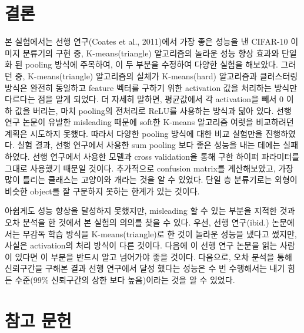 \documentclass[a4paper,9pt,hidelinks]{article}
\begin{document}
\begin{multicols*}{2}
\section{결론}

본 실험에서는 선행 연구(Coates et al., 2011)에서 가장 좋은 성능을 낸 CIFAR-10 이미지 분류기의 구현 중, K-means(triangle) 알고리즘의 놀라운 성능 향상 효과와 단일화 된 pooling 방식에 주목하여, 이 두 부분을 수정하여 다양한 실험을 해보았다.
그러던 중, K-means(triangle) 알고리즘의 실체가 K-means(hard) 알고리즘과 클러스터링 방식은 완전히 동일하고 feature 벡터를 구하기 위한 activation 값을 처리하는 방식만 다르다는 점을 알게 되었다.
더 자세히 말하면, 평균값에서 각 activation을 빼서 0 이하 값을 버리는, 마치 pooling의 전처리로 ReLU를 사용하는 방식과 닮아 있다.
선행 연구 논문이 유발한 misleading 때문에 soft한 K-means 알고리즘 여럿을 비교하려던 계획은 시도하지 못했다.
따라서 다양한 pooling 방식에 대한 비교 실험만을 진행하였다.
실험 결과, 선행 연구에서 사용한 sum pooling 보다 좋은 성능을 내는 데에는 실패하였다.
선행 연구에서 사용한 모델과 cross validation을 통해 구한 하이퍼 파라미터를 그대로 사용했기 때문일 것이다.
추가적으로 confusion matrix를 계산해보았고, 가장 많이 틀리는 클래스는 고양이와 개라는 것을 알 수 있었다.
단일 층 분류기로는 외형이 비슷한 object를 잘 구분하지 못하는 한계가 있는 것이다.

아쉽게도 성능 향상을 달성하지 못했지만, misleading 할 수 있는 부분을 지적한 것과 오차 분석을 한 것에서 본 실험의 의의를 찾을 수 있다.
우선, 선행 연구(ibid.) 논문에서는 무감독 학습 방식을 K-means(triangle)로 한 것이 놀라운 성능을 냈다고 썼지만, 사실은 activation의 처리 방식이 다른 것이다.
다음에 이 선행 연구 논문을 읽는 사람이 있다면 이 부분을 반드시 알고 넘어가야 좋을 것이다.
다음으로, 오차 분석을 통해 신뢰구간을 구해본 결과 선행 연구에서 달성 했다는 성능은 수 번 수행해서는 내기 힘든 수준(99\% 신뢰구간의 상한 보다 높음)이라는 것을 알 수 있었다.


\section*{참고 문헌}


\end{multicols*}
\end{document}
